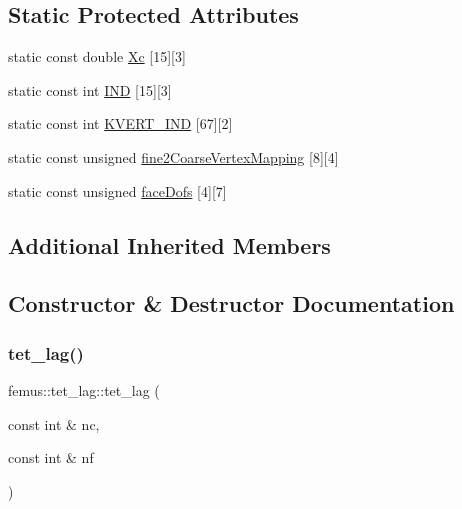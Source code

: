 \subsection*{Static Protected Attributes}
\begin{DoxyCompactItemize}
\item 
static const double \mbox{\hyperlink{classfemus_1_1tet__lag_ab7215633825a9b4e13ca88fe247df06c}{Xc}} \mbox{[}15\mbox{]}\mbox{[}3\mbox{]}
\item 
static const int \mbox{\hyperlink{classfemus_1_1tet__lag_a842f4e18f25e31cfb86aaa50189415ef}{I\+ND}} \mbox{[}15\mbox{]}\mbox{[}3\mbox{]}
\item 
static const int \mbox{\hyperlink{classfemus_1_1tet__lag_ac98c86ce4cc17e22ed7a3d4019616ef8}{K\+V\+E\+R\+T\+\_\+\+I\+ND}} \mbox{[}67\mbox{]}\mbox{[}2\mbox{]}
\item 
static const unsigned \mbox{\hyperlink{classfemus_1_1tet__lag_a688104062d37e02e94a2d398be0fc8ee}{fine2\+Coarse\+Vertex\+Mapping}} \mbox{[}8\mbox{]}\mbox{[}4\mbox{]}
\item 
static const unsigned \mbox{\hyperlink{classfemus_1_1tet__lag_a628e1f77119ab2590a29791c9d34ce41}{face\+Dofs}} \mbox{[}4\mbox{]}\mbox{[}7\mbox{]}
\end{DoxyCompactItemize}
\subsection*{Additional Inherited Members}


\subsection{Constructor \& Destructor Documentation}
\mbox{\label{classfemus_1_1tet__lag_a32cf3eee91dfe9c26539af6741a66078}} 
\subsubsection{\texorpdfstring{tet\+\_\+lag()}{tet\_lag()}}
{\footnotesize\ttfamily femus\+::tet\+\_\+lag\+::tet\+\_\+lag (\begin{DoxyParamCaption}\item[{const int \&}]{nc,  }\item[{const int \&}]{nf }\end{DoxyParamCaption})\hspace{0.3cm}{\ttfamily [inline]}}



